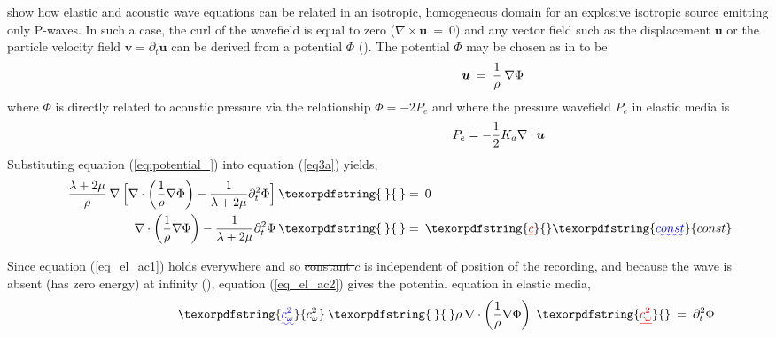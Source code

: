 \documentclass{article} %
\providecommand{\DIFaddtex}[1]{{\protect\color{blue}\uwave{#1}}} %
\providecommand{\DIFdeltex}[1]{{\protect\color{red}\sout{#1}}}                      %
\providecommand{\DIFaddbegin}{} %
\providecommand{\DIFaddend}{} %
\providecommand{\DIFdelbegin}{} %
\providecommand{\DIFdelend}{} %
\providecommand{\DIFadd}[1]{\texorpdfstring{\DIFaddtex{#1}}{#1}} %
\providecommand{\DIFdel}[1]{\texorpdfstring{\DIFdeltex{#1}}{}} %
\newcommand{\DIFscaledelfig}{0.5}
\newlength{\DIFdelgraphicswidth} %
\newlength{\DIFdelgraphicsheight} %
\newcommand{\DIFaddincludegraphics}[2][]{{\color{blue}\fbox{\DIFOincludegraphics[#1]{#2}}}} %
\newcommand{\DIFdelincludegraphics}[2][]{%
\sbox{\DIFdelgraphicsbox}{\DIFOincludegraphics[#1]{#2}}%
\settoboxwidth{\DIFdelgraphicswidth}{\DIFdelgraphicsbox} %
\settoboxtotalheight{\DIFdelgraphicsheight}{\DIFdelgraphicsbox} %
\scalebox{\DIFscaledelfig}{%
\parbox[b]{\DIFdelgraphicswidth}{\usebox{\DIFdelgraphicsbox}\\[-\baselineskip] \rule{\DIFdelgraphicswidth}{0em}}\llap{\resizebox{\DIFdelgraphicswidth}{\DIFdelgraphicsheight}{%
\setlength{\unitlength}{\DIFdelgraphicswidth}%
\begin{picture}(1,1)%
\thicklines\linethickness{2pt} %
{\color[rgb]{1,0,0}\put(0,0){\framebox(1,1){}}}%
{\color[rgb]{1,0,0}\put(0,0){\line( 1,1){1}}}%
{\color[rgb]{1,0,0}\put(0,1){\line(1,-1){1}}}%
\end{picture}%
}\hspace*{3pt}}} %
} %
\DeclareRobustCommand{\DIFaddbegin}{\DIFOaddbegin \let\includegraphics\DIFaddincludegraphics} %
\DeclareRobustCommand{\DIFaddend}{\DIFOaddend \let\includegraphics\DIFOincludegraphics} %
\DeclareRobustCommand{\DIFdelbegin}{\DIFOdelbegin \let\includegraphics\DIFdelincludegraphics} %
\DeclareRobustCommand{\DIFdelend}{\DIFOaddend \let\includegraphics\DIFOincludegraphics} %
\begin{document}
	\textcite{cance2015validity} show how elastic and acoustic wave equations can be related in an isotropic, homogeneous domain for an explosive isotropic source emitting only P-waves. In such a case, the curl of the wavefield is equal to zero ($\nabla \times \bm{u} \: = \: 0$) and any vector field such as the displacement $\bm{u}$ or the particle velocity field $\bm{v}= \partial_{t} \bm{u}$  can be derived from a potential $\Phi$ (\cite{kaufman2000acoustic}). The potential $\Phi$ may be chosen as in \textcite{cance2015validity} to be
	\begin{align}\label{eq:potential_}
		\shoveright \shoveright \shoveright \shoveright \shoveright \shoveright  \shoveright \shoveright  \shoveright  \shoveright  \shoveright \shoveright  \shoveright  \shoveright \shoveright \shoveright  \shoveright  \shoveright
		\bm{u} \: &=\: \frac{1}{\rho} \: \nabla \Phi
	\end{align}
	where $\Phi$ is directly related to acoustic pressure via the relationship $\Phi = -2 P_{e}$ and where the pressure wavefield $P_{e}$ in elastic media is %
	\begin{align}\label{eq:press_el}
		\shoveright \shoveright \shoveright \shoveright \shoveright \shoveright  \shoveright \shoveright  \shoveright  \shoveright  \shoveright \shoveright  \shoveright  \shoveright \shoveright \shoveright  \shoveright  \shoveright
		P_{e} = -\frac{1}{2} K_{a} \nabla \cdot \bm{u}
	\end{align}
	Substituting equation (\ref{eq:potential_}) into equation (\ref{eq3a}) yields,
	\begin{align}
		\shoveright  \shoveright  
		\frac{\lambda + 2 \mu}{\rho} \: \nabla \: \Big[  \nabla \cdot \bigg( \frac{1}{\rho} \nabla \Phi \bigg) - \frac{1}{\lambda + 2 \mu} \partial_{t}^{2} \Phi \Big] \:\DIFaddbegin \DIFadd{\: }\DIFaddend &= \: 0 \label{eq_el_ac1} \\ 
		\nabla \cdot \bigg( \frac{1}{\rho} \nabla \Phi \bigg) - \frac{1}{\lambda + 2 \mu} \partial_{t}^{2} \Phi \:\DIFaddbegin \DIFadd{\: }\DIFaddend & = \: \DIFdelbegin \DIFdel{c }\DIFdelend \DIFaddbegin \DIFadd{const }\DIFaddend \label{eq_el_ac2}
	\end{align} 

	Since equation (\ref{eq_el_ac1}) holds everywhere and so \DIFdelbegin \DIFdel{constant $c$ }\DIFdelend \DIFaddbegin \DIFadd{the constant }\DIFaddend is independent of position of the recording, and because the wave is absent (has zero energy) at infinity (\cite{kaufman2000acoustic}), equation (\ref{eq_el_ac2}) gives the potential equation in elastic media, 
	\begin{align} 
		\shoveright \shoveright \shoveright \shoveright \shoveright \shoveright	\shoveright \shoveright \shoveright	\shoveright
		\: \: \DIFaddbegin \DIFadd{c_{\omega}^{2} }\DIFaddend \: \DIFaddbegin \DIFadd{\: }\DIFaddend \rho \: \nabla \cdot \bigg(\frac{1}{\rho} \nabla \Phi \bigg) \: \:  \DIFdelbegin \DIFdel{c_{\omega}^{2} }\DIFdelend \:  &= \:  \partial_{t}^{2} \Phi  \label{eq_el_potential}
	\end{align}
\end{document}
